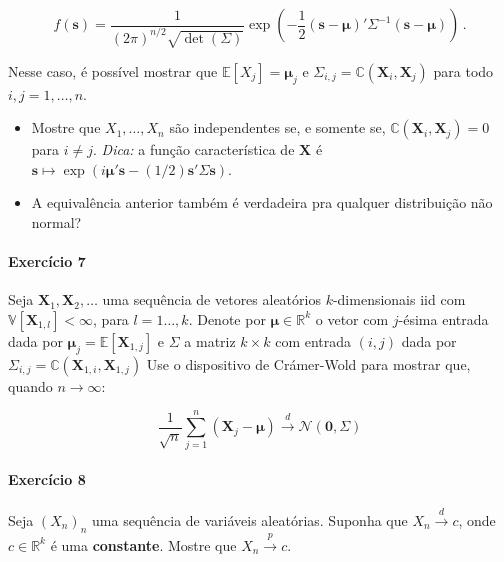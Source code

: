 \documentclass[10pt,a4paper]{article}
\begin{document}
$$f(\boldsymbol{s}) =\frac{1}{(2\pi)^{n/2} \sqrt{\operatorname{det}(\Sigma)}}\exp\left(-\frac{1}{2}(\boldsymbol{s}-\boldsymbol{\mu})'\Sigma^{-1} (\boldsymbol{s}-\boldsymbol{\mu})\right)\, .$$

Nesse caso, é possível mostrar que $\mathbb{E}[X_j] =\boldsymbol{\mu}_j$ e $\Sigma_{i,j} = \mathbb{C}(\boldsymbol{X}_i,\boldsymbol{X}_j)$ para todo $i,j=1,\ldots, n$.
\begin{itemize}
	\item[a] Mostre que $X_1,\ldots,X_n$ são independentes se, e somente se, $ \mathbb{C}(\boldsymbol{X}_i,\boldsymbol{X}_j) = 0$ para $i\neq j$. \textit{Dica:} a função característica de $\boldsymbol{X}$ é  $\boldsymbol{s}\mapsto \exp(i\boldsymbol{\mu}'\boldsymbol{s} - (1/2)\boldsymbol{s}'\Sigma \boldsymbol{s})$.
	\item[b] A equivalência anterior também é verdadeira pra qualquer distribuição não normal?  
\end{itemize}

\paragraph{Exercício 7} Seja $\boldsymbol{X}_1,\boldsymbol{X}_2,\ldots$ uma sequência de vetores aleatórios $k$-dimensionais iid com $\mathbb{V}[\boldsymbol{X}_{1,l}]<\infty$, para $l=1\ldots, k$. Denote por $\boldsymbol{\mu} \in \mathbb{R}^k$ o vetor com $j$-ésima entrada dada por $\boldsymbol{\mu}_j = \mathbb{E}[\boldsymbol{X}_{1,j}]$ e $\Sigma$ a matriz $k\times k$ com entrada $(i,j)$ dada por $\Sigma_{i,j} = \mathbb{C}(\boldsymbol{X}_{1,i},\boldsymbol{X}_{1,j})$ Use o dispositivo de Crámer-Wold para mostrar que, quando $n \to \infty$:

$$\frac{1}{\sqrt{n}}\sum_{j=1}^n(\boldsymbol{X}_j -\boldsymbol{\mu})\overset{d}{\to}\mathcal{N}(\boldsymbol{0},\Sigma)$$

\paragraph{Exercício 8} Seja $(X_n)_n$ uma sequência de variáveis aleatórias. Suponha que $X_n \overset{d}{\to}c$, onde $c \in \mathbb{R}^k$ é uma \textbf{constante}. Mostre que $X_n \overset{p}{\to} c$.
\end{document}
